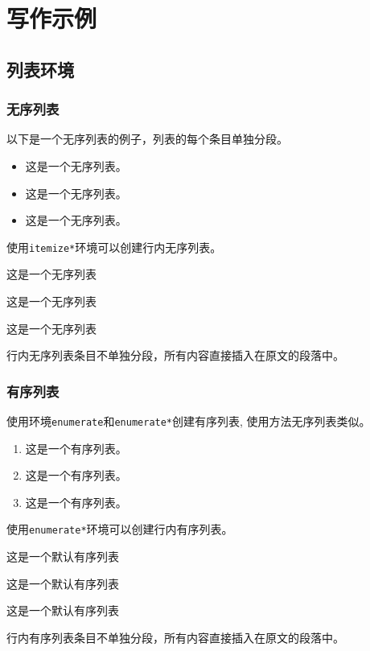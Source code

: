 
\chapter{写作示例}
\label{chap2}

\section{列表环境}

\subsection{无序列表}

以下是一个无序列表的例子，列表的每个条目单独分段。

\begin{itemize}
	\item 这是一个无序列表。
	\item 这是一个无序列表。
	\item 这是一个无序列表。
\end{itemize}

使用\verb+itemize*+环境可以创建行内无序列表。
\begin{itemize*}
	\item 这是一个无序列表
	\item 这是一个无序列表
	\item 这是一个无序列表
\end{itemize*}
行内无序列表条目不单独分段，所有内容直接插入在原文的段落中。

\subsection{有序列表}

使用环境\verb+enumerate+和\verb+enumerate*+创建有序列表,
使用方法无序列表类似。
\begin{enumerate}
	\item 这是一个有序列表。
	\item 这是一个有序列表。
	\item 这是一个有序列表。
\end{enumerate}

使用\verb+enumerate*+环境可以创建行内有序列表。
\begin{enumerate*}
	\item 这是一个默认有序列表
	\item 这是一个默认有序列表
	\item 这是一个默认有序列表
\end{enumerate*}
行内有序列表条目不单独分段，所有内容直接插入在原文的段落中。

